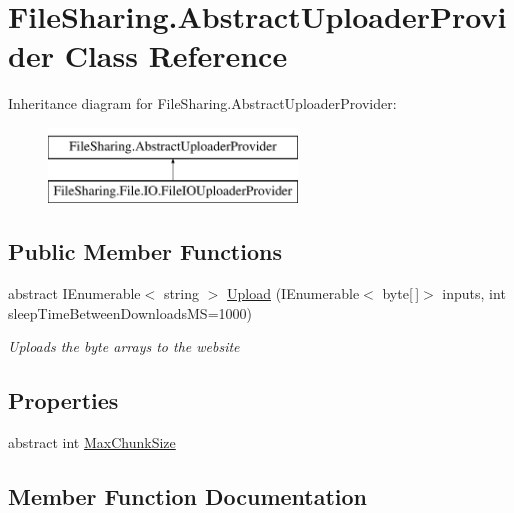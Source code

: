 \hypertarget{class_file_sharing_1_1_abstract_uploader_provider}{}\section{File\+Sharing.\+Abstract\+Uploader\+Provider Class Reference}
\label{class_file_sharing_1_1_abstract_uploader_provider}
Inheritance diagram for File\+Sharing.\+Abstract\+Uploader\+Provider\+:\begin{figure}[H]
\begin{center}
\leavevmode
\includegraphics[height=2.000000cm]{class_file_sharing_1_1_abstract_uploader_provider}
\end{center}
\end{figure}
\subsection*{Public Member Functions}
\begin{DoxyCompactItemize}
\item 
abstract I\+Enumerable$<$ string $>$ \hyperlink{class_file_sharing_1_1_abstract_uploader_provider_a951930bd16d0cfd061fa2dfd055e2601}{Upload} (I\+Enumerable$<$ byte\mbox{[}$\,$\mbox{]}$>$ inputs, int sleep\+Time\+Between\+Downloads\+MS=1000)
\begin{DoxyCompactList}\small\item\em Uploads the byte arrays to the website \end{DoxyCompactList}\end{DoxyCompactItemize}
\subsection*{Properties}
\begin{DoxyCompactItemize}
\item 
abstract int \hyperlink{class_file_sharing_1_1_abstract_uploader_provider_a5a62c7ab639093a3c4d7ea80c5b8a826}{Max\+Chunk\+Size}
\end{DoxyCompactItemize}


\subsection{Member Function Documentation}
\mbox{\label{class_file_sharing_1_1_abstract_uploader_provider_a951930bd16d0cfd061fa2dfd055e2601}} 
